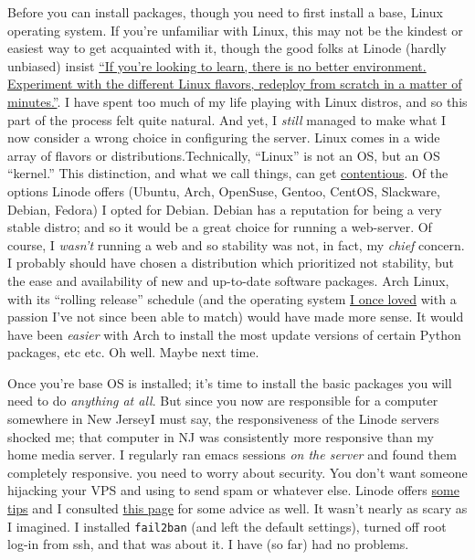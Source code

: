 \documentclass[
  12pt,
]{article}
\begin{document}
Before you can install packages, though you need to first install a
base, Linux operating system. If you're unfamiliar with Linux, this may
not be the kindest or easiest way to get acquainted with it, though the
good folks at Linode (hardly unbiased) insist
\href{https://www.linode.com/faq.cfm}{``If you're looking to learn,
there is no better environment. Experiment with the different Linux
flavors, redeploy from scratch in a matter of minutes.''}. I have spent
too much of my life playing with Linux distros, and so this part of the
process felt quite natural. And yet, I \emph{still} managed to make what
I now consider a wrong choice in configuring the server. Linux comes in
a wide array of flavors or distributions.{Technically, ``Linux'' is not
an OS, but an OS ``kernel.'' This distinction, and what we call things,
can get
\href{http://en.wikipedia.org/wiki/GNU/Linux_naming_controversy}{contentious}.}
Of the options Linode offers (Ubuntu, Arch, OpenSuse, Gentoo, CentOS,
Slackware, Debian, Fedora) I opted for Debian. Debian has a reputation
for being a very stable distro; and so it would be a great choice for
running a web-server. Of course, I \emph{wasn't} running a web and so
stability was not, in fact, my \emph{chief} concern. I probably should
have chosen a distribution which prioritized not stability, but the ease
and availability of new and up-to-date software packages. Arch Linux,
with its ``rolling release'' schedule (and the operating system
\href{http://www.mylinuxrig.com/post/11831613369/the-linux-setup-chris-forster-academic}{I
once loved} with a passion I've not since been able to match) would have
made more sense. It would have been \emph{easier} with Arch to install
the most update versions of certain Python packages, etc etc. Oh well.
Maybe next time.

Once you're base OS is installed; it's time to install the basic
packages you will need to do \emph{anything at all}. But since you now
are responsible for a computer somewhere in New Jersey{I must say, the
responsiveness of the Linode servers shocked me; that computer in NJ was
consistently more responsive than my home media server. I regularly ran
emacs sessions \emph{on the server} and found them completely
responsive.} you need to worry about security. You don't want someone
hijacking your VPS and using to send spam or whatever else. Linode
offers \href{http://library.linode.com/securing-your-server}{some tips}
and I consulted \href{http://feross.org/how-to-setup-your-linode/}{this
page} for some advice as well. It wasn't nearly as scary as I imagined.
I installed \texttt{fail2ban} (and left the default settings), turned
off root log-in from ssh, and that was about it. I have (so far) had no
problems.
\end{document}
